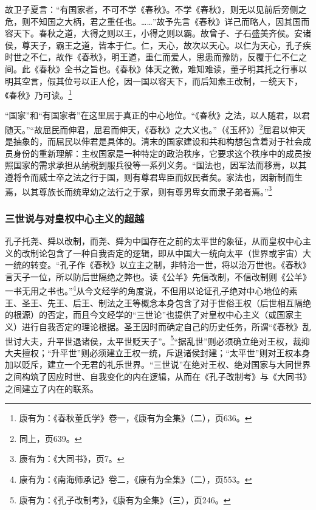 \documentclass[a4paper, 12pt, openright]{ctexbook}
\renewenvironment{quote}
  {\list{}{\rightmargin2\ccwd \leftmargin2\ccwd \itemindent=2\ccwd \listparindent=2\ccwd}%
   \item\relax\small\kaishu\color{black}}
  {\endlist}
\begin{document}
\begin{quote}
故卫子夏言：“有国家者，不可不学《春秋》。不学《春秋》，则无以见前后旁侧之危，则不知国之大柄，君之重任也。……”故予先言《春秋》详己而略人，因其国而容天下。春秋之道，大得之则以王，小得之则以霸。故曾子、子石盛美齐侯。安诸侯，尊天子，霸王之道，皆本于仁。仁，天心，故次以天心。以仁为天心，孔子疾时世之不仁，故作《春秋》，明王道，重仁而爱人，思患而豫防，反覆于仁不仁之间。此《春秋》全书之旨也。《春秋》体天之微，难知难读，董子明其托之行事以明其空言，假其位号以正人伦，因一国以容天下，而后知素王改制，一统天下，《春秋》乃可读。\footnote{康有为：《春秋董氏学》卷一，《康有为全集》（二），页636。}
\end{quote}

“国家”和“有国家者”在这里居于真正的中心地位。“《春秋》之法，以人随君，以君随天。”“故屈民而伸君，屈君而伸天，《春秋》之大义也。”（《玉杯》）\footnote{同上，页639。}屈君以伸天是抽象的，而屈民以伸君是具体的。清末的国家建设和共和构想包含着对于社会成员身份的重新理解：主权国家是一种特定的政治秩序，它要求这个秩序中的成员按照国家的需求承担从纳税到服兵役等一系列义务。“国法也，因军法而移焉，以其遵将令而威士卒之法之行于国，则有尊君卑臣而奴民者矣。家法也，因新制而生焉，以其尊族长而统卑幼之法行之于家，则有尊男卑女而隶子弟者焉。”\footnote{康有为：《大同书》，页7。}

\subsubsection{三世说与对皇权中心主义的超越}

孔子托尧、舜以改制，而尧、舜为中国存在之前的太平世的象征，从而皇权中心主义的改制论包含了一种自我否定的逻辑，即从中国大一统向太平（世界或宇宙）大一统的转变。“孔子作《春秋》以立主之制，非特治一世，将以治万世也。《春秋》言天子一位，所以防后世隔绝之弊也。读《公羊》先信改制，不信改制则《公羊》一书无用之书也。”\footnote{康有为：《南海师承记》卷二，《康有为全集》（二），页553。}从今文经学的角度说，不但用以论证孔子绝对中心地位的素王、圣王、先王、后王、制法之王等概念本身包含了对于世俗王权（后世相互隔绝的根源）的否定，而且今文经学的“三世论”也提供了对皇权中心主义（或国家主义）进行自我否定的理论根据。圣王因时而确定自己的历史任务，所谓“《春秋》乱世讨大夫，升平世退诸侯，太平世贬天子”。\footnote{康有为：《孔子改制考》，《康有为全集》（三），页246。}“据乱世”则必须确立绝对王权，裁抑大夫擅权；“升平世”则必须建立王权一统，斥退诸侯封建；“太平世”则对王权本身加以贬斥，建立一个无君的礼乐世界。“三世说”在绝对王权、绝对国家与大同世界之间构筑了因应时世、自我变化的内在逻辑，从而在《孔子改制考》与《大同书》之间建立了内在的联系。
\end{document}
